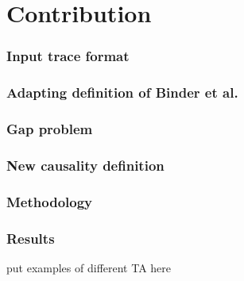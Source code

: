 \chapter{Contribution}

\subsection{Input trace format}

\subsection{Adapting definition of Binder et al.}

\subsection{Gap problem}

\subsection{New causality definition}

\subsection{Methodology}

\subsection{Results}

put examples of different TA here